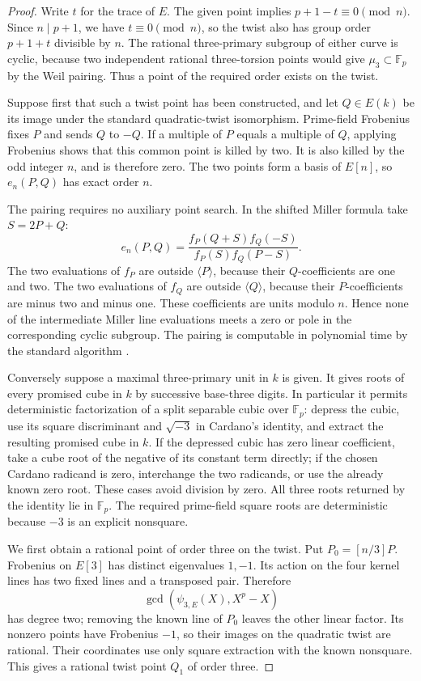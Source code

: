 \documentclass[11pt]{article}
\theoremstyle{definition}
\theoremstyle{remark}
\begin{document}
\begin{proof}
Write $t$ for the trace of $E$.  The given point implies
$p+1-t\equiv0\pmod n$.  Since $n\mid p+1$, we have
$t\equiv0\pmod n$, so the twist also has group order
$p+1+t$ divisible by $n$.
The rational three-primary subgroup of either curve is
cyclic, because two independent rational three-torsion
points would give $\mu_3\subset\mathbb F_p$ by the
Weil pairing.  Thus a point of the required order exists
on the twist.

Suppose first that such a twist point has been constructed,
and let $Q\in E(k)$ be its image under the standard
quadratic-twist isomorphism.  Prime-field Frobenius fixes
$P$ and sends $Q$ to $-Q$.  If a multiple of $P$ equals
a multiple of $Q$, applying Frobenius shows that this
common point is killed by two.  It is also killed by the
odd integer $n$, and is therefore zero.  The two points
form a basis of $E[n]$, so $e_n(P,Q)$ has exact order $n$.

The pairing requires no auxiliary point search.  In the
shifted Miller formula take $S=2P+Q$:
\[
 e_n(P,Q)=
 \frac{f_P(Q+S)f_Q(-S)}{f_P(S)f_Q(P-S)}.
\]
The two evaluations of $f_P$ are outside $\langle P\rangle$,
because their $Q$-coefficients are one and two.  The two
evaluations of $f_Q$ are outside $\langle Q\rangle$,
because their $P$-coefficients are minus two and minus one.
These coefficients are units modulo $n$.  Hence none of
the intermediate Miller line evaluations meets a zero or
pole in the corresponding cyclic subgroup.  The pairing
is computable in polynomial time by the standard algorithm
\cite[Theorem~XI.8.1 and Remark~XI.8.2, pp.~393--397]{Silverman2009}.

Conversely suppose a maximal three-primary unit in $k$ is
given.  It gives roots of every promised cube in $k$ by
successive base-three digits.  In particular it permits
deterministic factorization of a split separable cubic over
$\mathbb F_p$: depress the cubic, use its square
discriminant and $\sqrt{-3}$ in Cardano's identity, and
extract the resulting promised cube in $k$.  If the depressed cubic has zero linear coefficient, take a cube
root of the negative of its constant term directly; if the chosen Cardano radicand
is zero, interchange the two radicands, or use the already known
zero root. These cases avoid division by zero. All three
roots returned by the identity lie in $\mathbb F_p$.
The required prime-field square roots are deterministic
because $-3$ is an explicit nonsquare.

We first obtain a rational point of order three on the
twist.  Put $P_0=[n/3]P$.  Frobenius on $E[3]$ has
distinct eigenvalues $1,-1$.  Its action on the four
kernel lines has two fixed lines and a transposed pair.
Therefore
\[
 \gcd(\psi_{3,E}(X),X^p-X)
\]
has degree two; removing the known line of $P_0$ leaves
the other linear factor.  Its nonzero points have
Frobenius $-1$, so their images on the quadratic twist
are rational.  Their coordinates use only square
extraction with the known nonsquare.  This gives a
rational twist point $Q_1$ of order three.


\end{proof}
\end{document}
